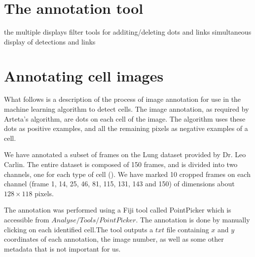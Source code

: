     \section{The annotation tool \statusnew}
    \label{sec:data_tool}
    
    
    	
    	the multiple displays
    	filter
    	tools for additing/deleting dots and links
    	simultaneous display of detections and links    
    	
    
    \section{Annotating cell images }
    \label{sec:data_annotation}
    
    What follows is a description of the process of image annotation for use in the machine learning algorithm to detect cells. The image annotation, as required by Arteta's \cite{arteta12} algorithm, are dots on each cell of the image. The algorithm uses these dots as positive examples, and all the remaining pixels as negative examples of a cell.
    
    We have annotated a subset of frames on the Lung dataset provided by Dr. Leo Carlin. The entire dataset is composed of 150 frames, and is divided into two channels, one for each type of cell (). We have marked 10 cropped frames on each channel (frame 1, 14, 25, 46, 81, 115, 131, 143 and 150) of dimensions about $128\times118$ pixels.
    
    The annotation was performed using a Fiji \cite{fiji12} tool called PointPicker \cite{thevanez14} which is accessible from \(Analyse/Tools/PointPicker\). The annotation is done by manually clicking on each identified cell.The tool outputs a $txt$ file containing $x$ and $y$ coordinates of each annotation, the image number, as well as some other metadata that is not important for us.
    
